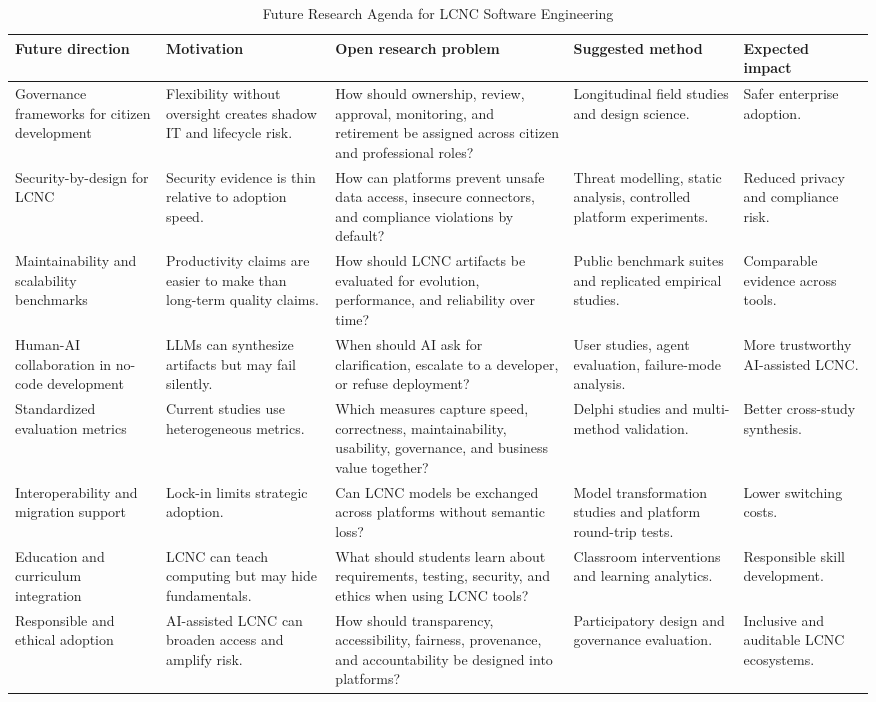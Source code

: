 \documentclass[conference]{IEEEtran}
\begin{document}
\begin{table}[t]
\centering
\caption{Future Research Agenda for LCNC Software Engineering}
\label{tab:future}
\scriptsize
\begin{tabularx}{\textwidth}{@{}p{} p{} p{} p{} p{}@{}}
\toprule
Future direction & Motivation & Open research problem & Suggested method & Expected impact \\
\midrule
Governance frameworks for citizen development & Flexibility without oversight creates shadow IT and lifecycle risk. & How should ownership, review, approval, monitoring, and retirement be assigned across citizen and professional roles? & Longitudinal field studies and design science. & Safer enterprise adoption. \\
Security-by-design for LCNC & Security evidence is thin relative to adoption speed. & How can platforms prevent unsafe data access, insecure connectors, and compliance violations by default? & Threat modelling, static analysis, controlled platform experiments. & Reduced privacy and compliance risk. \\
Maintainability and scalability benchmarks & Productivity claims are easier to make than long-term quality claims. & How should LCNC artifacts be evaluated for evolution, performance, and reliability over time? & Public benchmark suites and replicated empirical studies. & Comparable evidence across tools. \\
Human-AI collaboration in no-code development & LLMs can synthesize artifacts but may fail silently. & When should AI ask for clarification, escalate to a developer, or refuse deployment? & User studies, agent evaluation, failure-mode analysis. & More trustworthy AI-assisted LCNC. \\
Standardized evaluation metrics & Current studies use heterogeneous metrics. & Which measures capture speed, correctness, maintainability, usability, governance, and business value together? & Delphi studies and multi-method validation. & Better cross-study synthesis. \\
Interoperability and migration support & Lock-in limits strategic adoption. & Can LCNC models be exchanged across platforms without semantic loss? & Model transformation studies and platform round-trip tests. & Lower switching costs. \\
Education and curriculum integration & LCNC can teach computing but may hide fundamentals. & What should students learn about requirements, testing, security, and ethics when using LCNC tools? & Classroom interventions and learning analytics. & Responsible skill development. \\
Responsible and ethical adoption & AI-assisted LCNC can broaden access and amplify risk. & How should transparency, accessibility, fairness, provenance, and accountability be designed into platforms? & Participatory design and governance evaluation. & Inclusive and auditable LCNC ecosystems. \\
\bottomrule
\end{tabularx}
\end{table}
\end{document}
